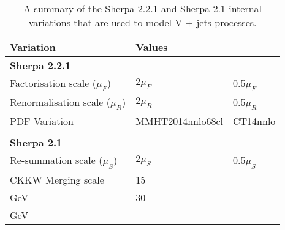 \begin{table}
  \centering
  \begin{tabular}{ l l l }
    \toprule
    \bfseries{Variation} & \multicolumn{2}{l}{\bfseries{Values}} \\
    \midrule
    \multicolumn{3}{l}{\bfseries{Sherpa 2.2.1}} \\
    Factorisation scale ($\mu_F$) & $2\mu_F$ & 0.5$\mu_F$ \\
    Renormalisation scale ($\mu_R$) & $2\mu_R$ & 0.5$\mu_R$ \\
    PDF Variation & MMHT2014nnlo68cl & CT14nnlo \\
    &&\\
    \multicolumn{3}{l}{\bfseries{Sherpa 2.1}} \\
    Re-summation scale ($\mu_S$) & $2\mu_S$ & 0.5$\mu_S$ \\
    CKKW Merging scale & 15 \\GeV & 30 \\GeV \\
    \bottomrule
  \end{tabular}
  \caption{A summary of the Sherpa 2.2.1 and Sherpa 2.1 internal variations that
  are used to model V + jets processes.}
  \label{tab:sherpa-variations}
\end{table}